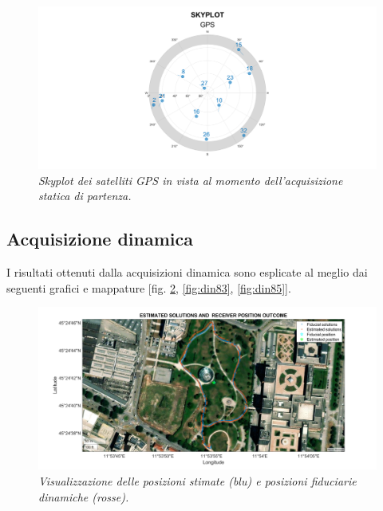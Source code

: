\documentclass[a4paper,11pt,twoside]{book}
\begin{document}
	\vspace{-0.5cm}
	
	
	\begin{figure}[H]
		\centering
		\includegraphics[scale=0.25]{"Immagini workbook/Immagini esp8/stat85"}
		\caption{\textit{Skyplot dei satelliti GPS in vista al momento dell'acquisizione statica di partenza.}}
		\label{fig:stat85}
	\end{figure}
	
	\subsection{Acquisizione dinamica}
	
	I risultati ottenuti dalla acquisizioni dinamica sono esplicate al meglio dai seguenti grafici e mappature [fig. \ref{fig:din82}, \ref{fig:din83}, \ref{fig:din85}].
	
	\begin{figure}[H]
		\centering
		\includegraphics[scale=0.30]{"Immagini workbook/Immagini esp8/din82"}
		\caption{\textit{Visualizzazione delle posizioni stimate (blu) e posizioni fiduciarie dinamiche (rosse).}}
		\label{fig:din82}
	\end{figure}
	
\end{document}
